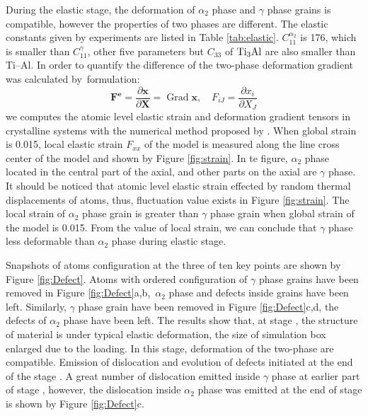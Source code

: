 \documentclass[materials,article,accept,moreauthors,pdftex,10pt,a4paper]{Definitions/mdpi}
\begin{document}
During the elastic stage, the deformation of $\alpha_2$ phase and $\gamma$ phase grains is compatible, however the properties of two phases are different. The elastic constants given by  experiments \cite{Schwarz1995,Tanaka1996} are listed in  Table \ref{tab:elastic}. $C_{11}^{\alpha_2}$ is 176, which is smaller than $C_{11}^{\gamma}$, other five parameters but $C_{33}$ of $\rm{Ti_3Al}$ are also smaller than Ti--Al. In order to quantify the difference of the two-phase deformation gradient was calculated by~formulation:
\begin{equation}
\label{eq:strain-grade}
\mathbf { F^e } = \frac { \partial \mathbf { x } } { \partial \mathbf { X } } = \operatorname { Grad } \mathbf { x } , \quad F _ { i J } = \frac { \partial x _ { i } } { \partial X _ { J } }
\end{equation}
we computes the atomic level elastic strain and deformation gradient tensors in crystalline systems with the numerical method proposed by \cite{Singh2006}. When global strain is 0.015, local elastic strain $F_{xx}$ of the model is measured along the line cross center of the model and shown by Figure \ref{fig:strain}. In te figure, $\alpha_2$ phase located in the central part of the axial, and other parts on the axial are $\gamma$ phase.  It should be noticed that atomic level elastic strain effected by random thermal displacements of atoms, thus, fluctuation value exists in Figure \ref{fig:strain}. The local strain of $\alpha_2$ phase grain is greater than $\gamma$ phase grain when global strain of the model is 0.015. From the value of local strain, we can conclude that $\gamma$ phase less deformable than $\alpha_2$ phase during elastic stage.


Snapshots of atoms configuration at the three of ten key points are shown by Figure \ref{fig:Defect}.  Atoms with ordered configuration  of $\gamma$ phase grains have been removed in Figure \ref{fig:Defect}a,b,\ $\alpha_2$ phase and defects inside grains have been left. Similarly, $\gamma$ phase grain have been removed in Figure \ref{fig:Defect}c,d, the defects of $\alpha_2$ phase have been left.  The results show that, at stage \uppercase\expandafter{}, the structure of material is under typical elastic deformation, the size of simulation box enlarged due to the loading. In this stage, deformation of the two-phase are compatible. Emission of dislocation and evolution of defects initiated at the end of the stage \uppercase\expandafter{}. A  great number of dislocation emitted inside $\gamma$ phase at earlier part of stage \uppercase\expandafter{}, however, the dislocation inside $\alpha_2$ phase was emitted at the end of stage \uppercase\expandafter{} is shown by Figure \ref{fig:Defect}c.
\end{document}
